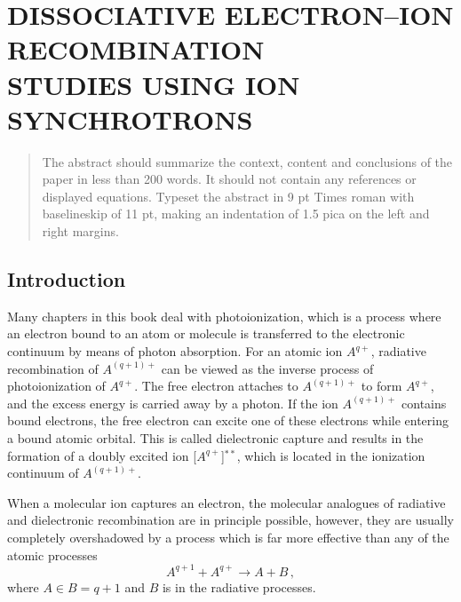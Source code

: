 \documentclass{ws-rv9x6}
\begin{document}
\setcounter{chapter}{0}

\chapter{DISSOCIATIVE ELECTRON--ION RECOMBINATION\\
STUDIES USING ION SYNCHROTRONS}


\author{Mats Larsson}

\address{Department of Physics, Stockholm University\\
P.O. Box 6730, S-113 85 Stockholm, Sweden\\
E-mail: mats.larsson\@physto.se}

\begin{abstract}
The abstract should summarize the context, content and conclusions of
the paper in less than 200 words. It should not contain any references
or displayed equations. Typeset the abstract in 9 pt Times roman with
baselineskip of 11 pt, making an indentation of 1.5 pica on the left
and right margins.
\end{abstract}

\section{Introduction}     %

Many chapters in this book deal with photoionization, which is a
process where an electron bound to an atom or molecule is transferred
to the electronic continuum by means of photon absorption. For an
atomic ion $A^{q+}$, radiative recombination of $A^{(q+1)+}$ can be
viewed as the inverse process of photoionization of $A^{q+}$. The free
electron attaches to $A^{(q+1)+}$ to form $A^{q+}$, and the excess
energy is carried away by a photon. If the ion $A^{(q+1)+}$ contains
bound electrons, the free electron can excite one of these electrons
while entering a bound atomic orbital. This is called dielectronic
capture and results in the formation of a doubly excited ion
[$A^{q+}$]$^{**}$, which is located in the ionization 
continuum of $A^{(q+1)+}$.

When a molecular ion captures an electron, the molecular analogues of
radiative and dielectronic recombination are in principle possible,
however, they are usually completely overshadowed by a process 
which is far more effective than any of the atomic processes
\begin{equation}	
A^{q+1} + A^{q+} \to A + B \,,
\end{equation}
where $A\in B=q+1$ and $B$ is in the radiative processes.
\end{document}
